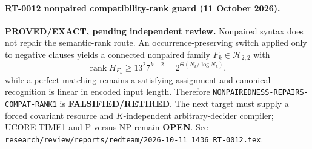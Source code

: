 \paragraph{RT-0012 nonpaired compatibility-rank guard (11 October 2026).}
\textbf{PROVED/EXACT, pending independent review.}
Nonpaired syntax does not repair the semantic-rank route.  An
occurrence-preserving switch applied only to negative clauses yields a
connected nonpaired family $F_k\in\mathcal H_{2,2}$ with
\[
 \operatorname{rank}H_{F_k}\ge13^2 7^{k-2}
 =2^{\Theta(N_k/\log N_k)},
\]
while a perfect matching remains a satisfying assignment and canonical
recognition is linear in encoded input length.  Therefore
\texttt{NONPAIREDNESS-REPAIRS-COMPAT-RANK1} is
\textbf{FALSIFIED/RETIRED}.  The next target must supply a forced covariant
resource and $K$-independent arbitrary-decider compiler; UCORE-TIME1 and P
versus NP remain \textbf{OPEN}.  See
\texttt{research/review/reports/redteam/2026-10-11\_1436\_RT-0012.tex}.
